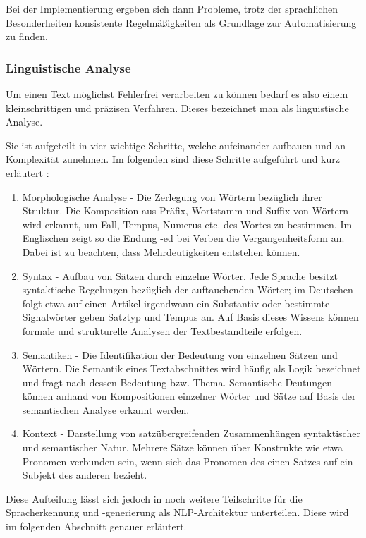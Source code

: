 \documentclass[12pt]{report}
\begin{document}
Bei der Implementierung ergeben sich dann Probleme, trotz der sprachlichen Besonderheiten konsistente Regelmäßigkeiten als Grundlage zur Automatisierung zu finden. 

\subsubsection{Linguistische Analyse}
Um einen Text möglichst Fehlerfrei verarbeiten zu können bedarf es also einem kleinschrittigen und präzisen Verfahren. Dieses bezeichnet man als linguistische Analyse.

Sie ist aufgeteilt in vier wichtige Schritte, welche aufeinander aufbauen und an Komplexität zunehmen. Im folgenden sind diese Schritte aufgeführt und kurz erläutert \cite{rs18}:

\begin{enumerate}
\item
Morphologische Analyse - Die Zerlegung von Wörtern bezüglich ihrer Struktur. Die Komposition aus Präfix, Wortstamm und Suffix von Wörtern wird erkannt, um Fall, Tempus, Numerus etc. des Wortes zu bestimmen. Im Englischen zeigt so die Endung -ed bei Verben die Vergangenheitsform an. Dabei ist zu beachten, dass Mehrdeutigkeiten entstehen können.
\item
Syntax - Aufbau von Sätzen durch einzelne Wörter. Jede Sprache besitzt syntaktische Regelungen bezüglich der auftauchenden Wörter; im Deutschen folgt etwa auf einen Artikel irgendwann ein Substantiv oder bestimmte Signalwörter geben Satztyp und Tempus an. Auf Basis dieses Wissens können formale und strukturelle Analysen der Textbestandteile erfolgen.
\item
Semantiken - Die Identifikation der Bedeutung von einzelnen Sätzen und Wörtern. Die Semantik eines Textabschnittes wird häufig als \glqq  Logik\grqq{} bezeichnet und fragt nach dessen Bedeutung bzw. Thema. Semantische Deutungen können anhand von Kompositionen einzelner Wörter und Sätze auf Basis der semantischen Analyse erkannt werden.
\item
Kontext - Darstellung von satzübergreifenden Zusammenhängen syntaktischer und semantischer Natur. Mehrere Sätze können über Konstrukte wie etwa Pronomen verbunden sein, wenn sich das Pronomen des einen Satzes auf ein Subjekt des anderen bezieht. 
\end{enumerate}

Diese Aufteilung lässt sich jedoch in noch weitere Teilschritte für die Spracherkennung und -generierung als NLP-Architektur unterteilen. Diese wird im folgenden Abschnitt genauer erläutert. 
\end{document}
